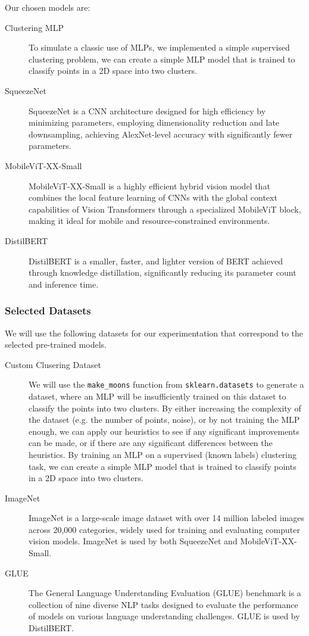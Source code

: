 \documentclass{article}
\begin{document}
Our chosen models are:
\begin{description}
	\item[Clustering MLP] {
		To simulate a classic use of MLPs, we implemented a simple supervised clustering problem, we can create a simple MLP model that is trained to classify points in a 2D space into two clusters.
		}
	\item[SqueezeNet \cite{squeezenet}] SqueezeNet is a CNN architecture designed for high efficiency by minimizing parameters, employing dimensionality reduction and late downsampling, achieving AlexNet-level accuracy with significantly fewer parameters.
	\item[MobileViT-XX-Small \cite{mobilevit}] MobileViT-XX-Small is a highly efficient hybrid vision model that combines the local feature learning of CNNs with the global context capabilities of Vision Transformers through a specialized MobileViT block, making it ideal for mobile and resource-constrained environments.
	\item[DistilBERT \cite{distilbert}] DistilBERT is a smaller, faster, and lighter version of BERT achieved through knowledge distillation, significantly reducing its parameter count and inference time.
\end{description}

\subsubsection{Selected Datasets}
We will use the following datasets for our experimentation that correspond to the selected pre-trained models.

\begin{description}
	\item[Custom Clusering Dataset] {
		We will use the \texttt{make\_moons} function from \texttt{sklearn.datasets} to generate a dataset, where an MLP will be insufficiently trained on this dataset to classify the points into two clusters.
		By either increasing the complexity of the dataset (e.g. the number of points, noise), or by not training the MLP enough, we can apply our heuristics to see if any significant improvements can be made, or if there are any significant differences between the heuristics.
		By training an MLP on a supervised (known labels) clustering task, we can create a simple MLP model that is trained to classify points in a 2D space into two clusters.
		}
	\item[ImageNet \cite{imagenet}] {
		ImageNet is a large-scale image dataset with over 14 million labeled images across 20,000 categories, widely used for training and evaluating computer vision models.
		ImageNet is used by both SqueezeNet and MobileViT-XX-Small.
		}
	\item[GLUE \cite{GLUE}] {
		The General Language Understanding Evaluation (GLUE) benchmark is a collection of nine diverse NLP tasks designed to evaluate the performance of models on various language understanding challenges.
		GLUE is used by DistilBERT.
		}
\end{description}
\end{document}
